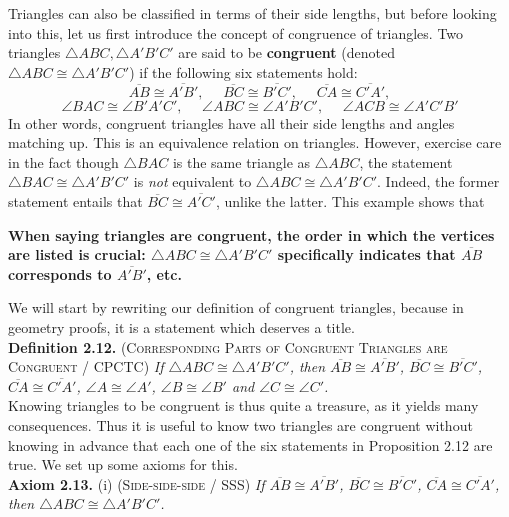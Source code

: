 \documentclass[leqno]{book}
\begin{document}
Triangles can also be classified in terms of their side lengths, but before looking into this, let us first introduce the concept of congruence of triangles.  Two triangles $\triangle ABC,\triangle A'B'C'$ are said to be \textbf{congruent} (denoted $\triangle ABC\cong\triangle A'B'C'$) if the following six statements hold:
$$\overline{AB}\cong\overline{A'B'},~~~~~~\overline{BC}\cong\overline{B'C'},~~~~~~\overline{CA}\cong\overline{C'A'},$$
$$\angle BAC\cong\angle B'A'C',~~~~~~\angle ABC\cong\angle A'B'C',~~~~~~\angle ACB\cong\angle A'C'B'$$
In other words, congruent triangles have all their side lengths and angles matching up.  This is an equivalence relation on triangles.  However, exercise care in the fact though $\triangle BAC$ is the same triangle as $\triangle ABC$, the statement $\triangle BAC\cong\triangle A'B'C'$ is \emph{not} equivalent to $\triangle ABC\cong\triangle A'B'C'$.  Indeed, the former statement entails that $\overline{BC}\cong\overline{A'C'}$, unlike the latter.  This example shows that
\begin{center}
\textbf{When saying triangles are congruent, the order in which the vertices are listed is crucial: $\triangle ABC\cong\triangle A'B'C'$ specifically indicates that $\overline{AB}$ corresponds to $\overline{A'B'}$, etc.}
\end{center}
We will start by rewriting our definition of congruent triangles, because in geometry proofs, it is a statement which deserves a title.\\

\noindent\textbf{Definition 2.12.} \textsc{(Corresponding Parts of Congruent Triangles are Congruent / CPCTC)} \emph{If $\triangle ABC\cong\triangle A'B'C'$, then $\overline{AB}\cong\overline{A'B'}$, $\overline{BC}\cong\overline{B'C'}$, $\overline{CA}\cong\overline{C'A'}$, $\angle A\cong\angle A'$, $\angle B\cong\angle B'$ and $\angle C\cong\angle C'$.}\\

\noindent Knowing triangles to be congruent is thus quite a treasure, as it yields many consequences.  Thus it is useful to know two triangles are congruent without knowing in advance that each one of the six statements in Proposition 2.12 are true.  We set up some axioms for this.\\

\noindent\textbf{Axiom 2.13.} (i) \textsc{(Side-side-side / SSS)} \emph{If $\overline{AB}\cong\overline{A'B'}$, $\overline{BC}\cong\overline{B'C'}$, $\overline{CA}\cong\overline{C'A'}$, then $\triangle ABC\cong\triangle A'B'C'$.}
\end{document}
